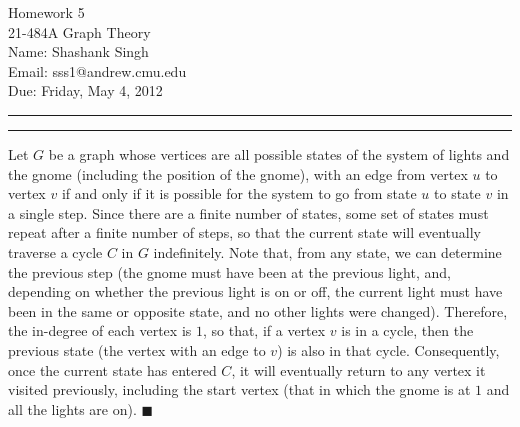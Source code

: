 \documentclass[11pt]{article}
\makeatletter
\newcounter{questionCounter}
\newcounter{partCounter}[questionCounter]
\newenvironment{question}[2][\arabic{questionCounter}]{%
    \setcounter{partCounter}{0}%
    \vspace{.25in} \hrule \vspace{0.5em}%
        \noindent{\bf #2}%
    \vspace{0.8em} \hrule \vspace{.10in}%
    \addtocounter{questionCounter}{1}%
}{}
\newcommand{\myname}{Shashank Singh}
\newcommand{\myandrew}{sss1@andrew.cmu.edu}
\newcommand{\myclass}{21-484A Graph Theory}
\newcommand{\myhwnum}{5}
\newcommand{\duedate}{Friday, May 4, 2012}
\renewcommand{\qed}{\quad $\blacksquare$}
\makeatother
\begin{document}
\thispagestyle{plain}

{\Large Homework \myhwnum} \\
\myclass \\
Name: \myname \\
Email: \myandrew \\
Due: \duedate
\begin{question}{Problem 1}
Let $G$ be a graph whose vertices are all possible states of the system of
lights and the gnome (including the position of the gnome), with an edge from
vertex $u$ to vertex $v$ if and only if it is possible for the system to go
from state $u$ to state $v$ in a single step. Since there are a finite number
of states, some set of states must repeat after a finite number of steps, so
that the current state will eventually traverse a cycle $C$ in $G$ indefinitely.
Note that, from any state, we can determine the previous step (the gnome must
have been at the previous light, and, depending on whether the previous light
is on or off, the current light must have been in the same or opposite state,
and no other lights were changed). Therefore, the in-degree of each vertex is
$1$, so that, if a vertex $v$ is in a cycle, then the previous state (the
vertex with an edge to $v$) is also in that cycle. Consequently, once the
current state has entered $C$, it will eventually return to any vertex it
visited previously, including the start vertex (that in which the gnome is at
$1$ and all the lights are on). \qed
\end{question}
\end{document}
